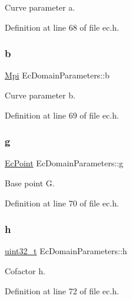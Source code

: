 Curve parameter a. 



Definition at line 68 of file ec.\+h.

\mbox{\label{structEcDomainParameters_a13b11f7ebb928f2407abb4ce5b40fffd}} 
\subsubsection{\texorpdfstring{b}{b}}
{\footnotesize\ttfamily \hyperlink{structMpi}{Mpi} Ec\+Domain\+Parameters\+::b}



Curve parameter b. 



Definition at line 69 of file ec.\+h.

\mbox{\label{structEcDomainParameters_a48b4ef67c6d94e7be182ae6b73708511}} 
\subsubsection{\texorpdfstring{g}{g}}
{\footnotesize\ttfamily \hyperlink{structEcPoint}{Ec\+Point} Ec\+Domain\+Parameters\+::g}



Base point G. 



Definition at line 70 of file ec.\+h.

\mbox{\label{structEcDomainParameters_a1dce92caa10cbc17456426098ff7faea}} 
\subsubsection{\texorpdfstring{h}{h}}
{\footnotesize\ttfamily \hyperlink{stdint_8h_a435d1572bf3f880d55459d9805097f62}{uint32\+\_\+t} Ec\+Domain\+Parameters\+::h}



Cofactor h. 



Definition at line 72 of file ec.\+h.

